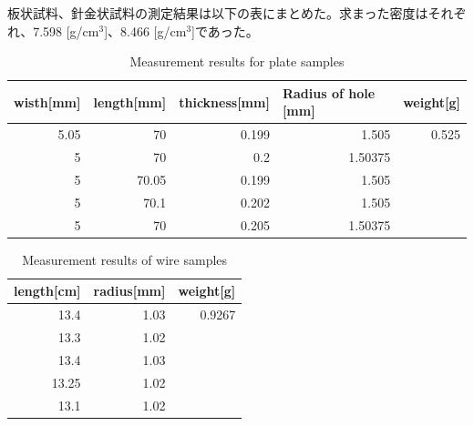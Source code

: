 \documentclass[a4paper,11pt]{jsarticle}
\begin{document}
板状試料、針金状試料の測定結果は以下の表にまとめた。求まった密度はそれぞれ、7.598 [g/cm$^3$]、8.466 [g/cm$^3$]であった。
\begin{table}[H]
  \centering
  \caption{Measurement results for plate samples}
    \begin{tabular}{rrrrr}
    \multicolumn{1}{l}{wisth[mm]} & \multicolumn{1}{l}{length[mm]} & \multicolumn{1}{l}{thickness[mm]} & \multicolumn{1}{l}{Radius of hole [mm]} & \multicolumn{1}{l}{weight[g]} \\
    \midrule
    5.05  & 70    & 0.199 & 1.505 & 0.525 \\
    5     & 70    & 0.2   & 1.50375 &  \\
    5     & 70.05 & 0.199 & 1.505 &  \\
    5     & 70.1  & 0.202 & 1.505 &  \\
    5     & 70    & 0.205 & 1.50375 &  \\
    \end{tabular}%
  \label{tab:addlabel}%
\end{table}%
\begin{table}[H]
  \centering
  \caption{Measurement results of wire samples}
    \begin{tabular}{rrr}
    \multicolumn{1}{l}{length[cm]} & \multicolumn{1}{l}{radius[mm]} & \multicolumn{1}{l}{weight[g]} \\
    \midrule
    13.4  & 1.03  & 0.9267 \\
    13.3  & 1.02  &  \\
    13.4  & 1.03  &  \\
    13.25 & 1.02  &  \\
    13.1  & 1.02  &  \\
    \end{tabular}%
  \label{tab:addlabel}%
\end{table}%
\end{document}
